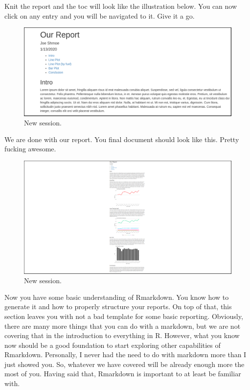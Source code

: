 \documentclass[]{book}
\begin{document}
Knit the report and the toc will look like the illustration below. You can now click on any entry and you will be navigated to it. Give it a go.

\begin{figure}
\centering
\includegraphics{markdown11.png}
\caption{New session.}
\end{figure}

We are done with our report. You final document should look like this. Pretty fucking awesome.

\begin{figure}
\centering
\includegraphics{markdown12.png}
\caption{New session.}
\end{figure}

Now you have some basic understanding of Rmarkdown. You know how to generate it and how to properly structure your reports. On top of that, this section leaves you with not a bad template for some basic reporting. Obviously, there are many more things that you can do with a markdown, but we are not covering that in the introduction to everything in R. However, what you know now should be a good foundation to start exploring other capabilities of Rmarkdown. Personally, I never had the need to do with markdown more than I just showed you. So, whatever we have covered will be already enough more the most of you. Having said that, Rmarkdown is important to at least be familiar with.
\end{document}
